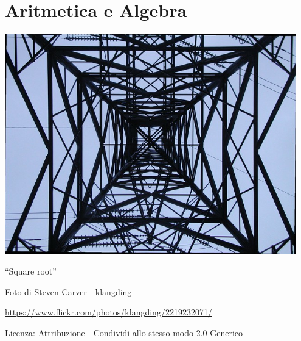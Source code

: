 \part{Aritmetica e Algebra}

\includegraphics[width=0.95\textwidth]{img/square_root.jpg}
  \begin{center}
    {\large ``Square root''}\par
    Foto di Steven Carver - klangding\par
    \url{https://www.flickr.com/photos/klangding/2219232071/}\par
    Licenza: Attribuzione - Condividi allo stesso modo 2.0 Generico\par
  \end{center}
\clearpage
\cleardoublepage
